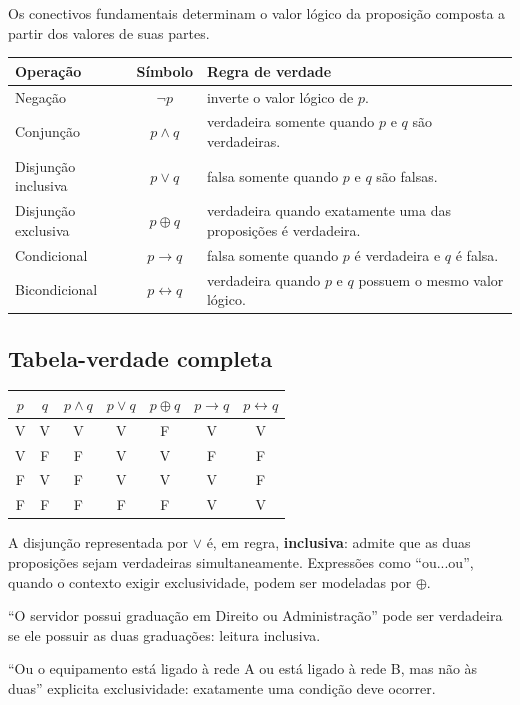 Os conectivos fundamentais determinam o valor lógico da proposição composta a partir dos valores de suas partes.

\begin{table}[ht]
\centering
\small
\begin{tabularx}{\textwidth}{l c X}
\toprule
Operação & Símbolo & Regra de verdade \\
\midrule
Negação & $\neg p$ & inverte o valor lógico de $p$. \\
Conjunção & $p\land q$ & verdadeira somente quando $p$ e $q$ são verdadeiras. \\
Disjunção inclusiva & $p\lor q$ & falsa somente quando $p$ e $q$ são falsas. \\
Disjunção exclusiva & $p\oplus q$ & verdadeira quando exatamente uma das proposições é verdadeira. \\
Condicional & $p\to q$ & falsa somente quando $p$ é verdadeira e $q$ é falsa. \\
Bicondicional & $p\leftrightarrow q$ & verdadeira quando $p$ e $q$ possuem o mesmo valor lógico. \\
\bottomrule
\end{tabularx}
\end{table}

\subsection{Tabela-verdade completa}

\begin{center}
\begin{tabular}{cc|ccccc}
\toprule
$p$ & $q$ & $p\land q$ & $p\lor q$ & $p\oplus q$ & $p\to q$ & $p\leftrightarrow q$ \\
\midrule
V & V & V & V & F & V & V \\
V & F & F & V & V & F & F \\
F & V & F & V & V & V & F \\
F & F & F & F & F & V & V \\
\bottomrule
\end{tabular}
\end{center}

A disjunção representada por $\lor$ é, em regra, \textbf{inclusiva}: admite que as duas proposições sejam verdadeiras simultaneamente. Expressões como ``ou...ou'', quando o contexto exigir exclusividade, podem ser modeladas por $\oplus$.

\begin{exemplo}
``O servidor possui graduação em Direito ou Administração'' pode ser verdadeira se ele possuir as duas graduações: leitura inclusiva.

``Ou o equipamento está ligado à rede A ou está ligado à rede B, mas não às duas'' explicita exclusividade: exatamente uma condição deve ocorrer.
\end{exemplo}


